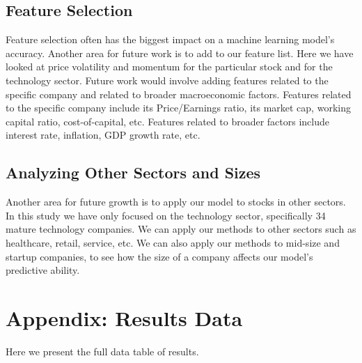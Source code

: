 \documentclass[pageno]{jpaper}
\begin{document}
\subsection{Feature Selection}
Feature selection often has the biggest impact on a machine learning model’s accuracy. Another area for future work is to add to our feature list. Here we have looked at price volatility and momentum for the particular stock and for the technology sector. Future work would involve adding features related to the specific company and related to broader macroeconomic factors. Features related to the specific company include its Price/Earnings ratio, its market cap, working capital ratio, cost-of-capital, etc. Features related to broader factors include interest rate, inflation, GDP growth rate, etc.

\subsection{Analyzing Other Sectors and Sizes}
Another area for future growth is to apply our model to stocks in other sectors. In this study we have only focused on the technology sector, specifically 34 mature technology companies. We can apply our methods to other sectors such as healthcare, retail, service, etc. We can also apply our methods to mid-size and startup companies, to see how the size of a company affects our model’s predictive ability. 

\newpage
\section*{Appendix: Results Data}
\label{app: appendix}
Here we present the full data table of results.

\newpage
{}


\end{document}
